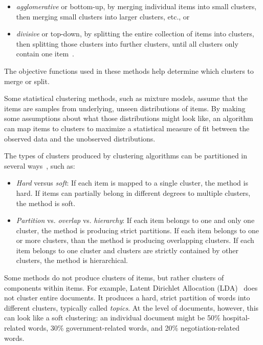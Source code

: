 \begin{itemize}
\item {\it agglomerative} or bottom-up, by merging individual items into small clusters, then merging small clusters into larger clusters, etc., or
\item {\it divisive} or top-down, by splitting the entire collection of items into clusters, then splitting those clusters into further clusters, until all clusters only contain one item~\cite{xu2005survey}.
\end{itemize}

The objective functions used in these methods help determine which clusters to merge or split.

Some statistical clustering methods, such as mixture models, assume that the items are samples from underlying, unseen distributions of items. By making some assumptions about what those distributions might look like, an algorithm can map items to clusters to maximize a statistical measure of fit between the observed data and the unobserved distributions.


The types of clusters produced by clustering algorithms can be partitioned in several ways~\cite{wiki:clustering}, such as:

\begin{itemize}
\item {\it Hard} versus {\it soft}: If each item is mapped to a single cluster, the method is hard. If items can partially belong in different degrees to multiple clusters, the method is soft.
\item {\it Partition} vs. {\it overlap} vs. {\it hierarchy}: If each item belongs to one and only one cluster, the method is producing strict partitions. If each item belongs to one or more clusters, than the method is producing overlapping clusters. If each item belongs to one cluster and clusters are strictly contained by other clusters, the method is hierarchical.
\end{itemize}

Some methods do not produce clusters of items, but rather clusters of components within items. For example, Latent Dirichlet Allocation (LDA)~\cite{lda} does not cluster entire documents. It produces a hard, strict partition of words into different clusters, typically called {\it topics}. At the level of documents, however, this can look like a soft clustering: an individual document might be 50\% hospital-related words, 30\% government-related words, and 20\% negotiation-related words.

